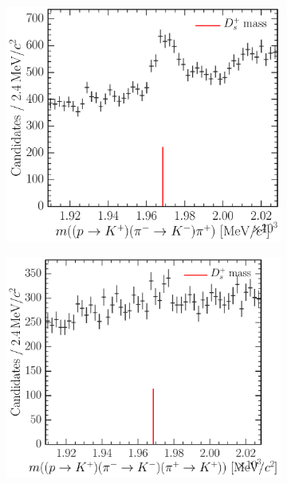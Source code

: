 \begin{figure}
\begin{subfigure}[b]{0.3\textwidth}
    \caption{\decay{\PDplus}{\Ppiplus\Ppiminus\Ppiplus}}
    \label{fig:cpv:selection:background_study:ppipi_meson:dplus_pipipi}
  \end{subfigure}
  \begin{subfigure}[b]{0.3\textwidth}
    \includegraphics[width=\textwidth]{figures/cpv/selection/background_study/ppipi/LcToppipi_2012_MagDown_Ds_ppTokp_pimTokm_pip}
    \caption{\decay{\PDsplus}{\PKplus\PKminus\Ppiplus}}
    \label{fig:cpv:selection:background_study:ppipi_meson:dsplus_kkpi}
  \end{subfigure}
  \begin{subfigure}[b]{0.3\textwidth}
    \includegraphics[width=\textwidth]{figures/cpv/selection/background_study/ppipi/LcToppipi_2012_MagDown_Ds_ppTokp_pimTokm_pipTokp}

\end{subfigure}
\end{figure}
